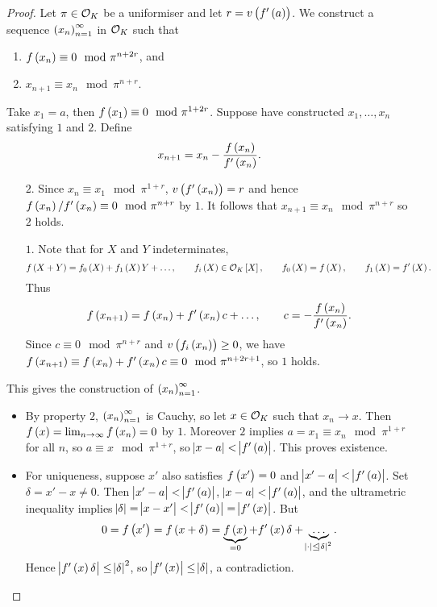 \begin{proof}
Let $ \pi \in \mathcal{O}_K $ be a uniformiser and let $ r = v\br{f'\br{a}} $. We construct a sequence $ \br{x_n}_{n = 1}^\infty $ in $ \mathcal{O}_K $ such that
\begin{enumerate}
\item $ f\br{x_n} \equiv 0 \mod \pi^{n + 2r} $, and
\item $ x_{n + 1} \equiv x_n \mod \pi^{n + r} $.
\end{enumerate}
Take $ x_1 = a $, then $ f\br{x_1} \equiv 0 \mod \pi^{1 + 2r} $. Suppose have constructed $ x_1, \dots, x_n $ satisfying $ 1 $ and $ 2 $. Define
$$ x_{n + 1} = x_n - \dfrac{f\br{x_n}}{f'\br{x_n}}. $$
\begin{itemize}
\item[$ 2 $.] Since $ x_n \equiv x_1 \mod \pi^{1 + r} $, $ v\br{f'\br{x_n}} = r $ and hence $ f\br{x_n} / f'\br{x_n} \equiv 0 \mod \pi^{n + r} $ by $ 1 $. It follows that $ x_{n + 1} \equiv x_n \mod \pi^{n + r} $ so $ 2 $ holds.
\item[$ 1 $.] Note that for $ X $ and $ Y $ indeterminates,
$$ f\br{X + Y} = f_0\br{X} + f_1\br{X}Y + \dots, \qquad f_i\br{X} \in \OOO_K\sbr{X}, \qquad f_0\br{X} = f\br{X}, \qquad f_1\br{X} = f'\br{X}. $$
Thus
$$ f\br{x_{n + 1}} = f\br{x_n} + f'\br{x_n}c + \dots, \qquad c = -\dfrac{f\br{x_n}}{f'\br{x_n}}. $$
Since $ c \equiv 0 \mod \pi^{n + r} $ and $ v\br{f_i\br{x_n}} \ge 0 $, we have $ f\br{x_{n + 1}} \equiv f\br{x_n} + f'\br{x_n}c \equiv 0 \mod \pi^{n + 2r + 1} $, so $ 1 $ holds.
\end{itemize}
This gives the construction of $ \br{x_n}_{n = 1}^\infty $.
\begin{itemize}
\item By property $ 2 $, $ \br{x_n}_{n = 1}^\infty $ is Cauchy, so let $ x \in \mathcal{O}_K $ such that $ x_n \to x $. Then $ f\br{x} = \lim_{n \to \infty} f\br{x_n} = 0 $ by $ 1 $. Moreover $ 2 $ implies $ a = x_1 \equiv x_n \mod \pi^{1 + r} $ for all $ n $, so $ a \equiv x \mod \pi^{1 + r} $, so $ \abs{x - a} < \abs{f'\br{a}} $. This proves existence.
\item For uniqueness, suppose $ x' $ also satisfies $ f\br{x'} = 0 $ and $ \abs{x' - a} < \abs{f'\br{a}} $. Set $ \delta = x' - x \ne 0 $. Then $ \abs{x' - a} < \abs{f'\br{a}} $, $ \abs{x - a} < \abs{f'\br{a}} $, and the ultrametric inequality implies $ \abs{\delta} = \abs{x - x'} < \abs{f'\br{a}} = \abs{f'\br{x}} $. But
$$ 0 = f\br{x'} = f\br{x + \delta} = \underbrace{f\br{x}}_{= 0} + f'\br{x}\delta + \underbrace{\dots}_{\abs{\cdot} \le \abs{\delta}^2}. $$
Hence $ \abs{f'\br{x}\delta} \le \abs{\delta}^2 $, so $ \abs{f'\br{x}} \le \abs{\delta} $, a contradiction.
\end{itemize}
\end{proof}

